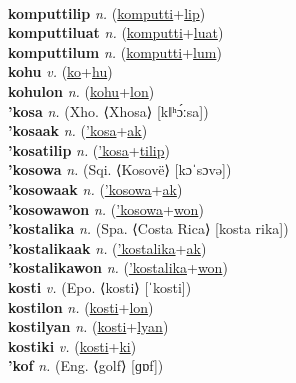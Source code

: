  \label{komputtilon} \\
\textbf{komputtilip} \textit{n.} (\hyperref[komputti]{komputti}+\hyperref[lip]{lip})
 \label{komputtilip} \\
\textbf{komputtiluat} \textit{n.} (\hyperref[komputti]{komputti}+\hyperref[luat]{luat})
 \label{komputtiluat} \\
\textbf{komputtilum} \textit{n.} (\hyperref[komputti]{komputti}+\hyperref[lum]{lum})
 \label{komputtilum} \\
\textbf{kohu} \textit{v.} (\hyperref[ko]{ko}+\hyperref[hu]{hu})
 \label{kohu} \\
\textbf{kohulon} \textit{n.} (\hyperref[kohu]{kohu}+\hyperref[lon]{lon})
 \label{kohulon} \\
\textbf{'kosa} \textit{n.} (Xho. ⟨Xhosa⟩ [kǁʰɔ́ːsa])
 \label{'kosa} \\
\textbf{'kosaak} \textit{n.} (\hyperref['kosa]{'kosa}+\hyperref[ak]{ak})
 \label{'kosaak} \\
\textbf{'kosatilip} \textit{n.} (\hyperref['kosa]{'kosa}+\hyperref[tilip]{tilip})
 \label{'kosatilip} \\
\textbf{'kosowa} \textit{n.} (Sqi. ⟨Kosovë⟩ [kɔˈsɔvə])
 \label{'kosowa} \\
\textbf{'kosowaak} \textit{n.} (\hyperref['kosowa]{'kosowa}+\hyperref[ak]{ak})
 \label{'kosowaak} \\
\textbf{'kosowawon} \textit{n.} (\hyperref['kosowa]{'kosowa}+\hyperref[won]{won})
 \label{'kosowawon} \\
\textbf{'kostalika} \textit{n.} (Spa. ⟨Costa Rica⟩ [kosta rika])
 \label{'kostalika} \\
\textbf{'kostalikaak} \textit{n.} (\hyperref['kostalika]{'kostalika}+\hyperref[ak]{ak})
 \label{'kostalikaak} \\
\textbf{'kostalikawon} \textit{n.} (\hyperref['kostalika]{'kostalika}+\hyperref[won]{won})
 \label{'kostalikawon} \\
\textbf{kosti} \textit{v.} (Epo. ⟨kosti⟩ [ˈkosti])
 \label{kosti} \\
\textbf{kostilon} \textit{n.} (\hyperref[kosti]{kosti}+\hyperref[lon]{lon})
 \label{kostilon} \\
\textbf{kostilyan} \textit{n.} (\hyperref[kosti]{kosti}+\hyperref[lyan]{lyan})
 \label{kostilyan} \\
\textbf{kostiki} \textit{v.} (\hyperref[kosti]{kosti}+\hyperref[ki]{ki})
 \label{kostiki} \\
\textbf{'kof} \textit{n.} (Eng. ⟨golf⟩ [ɡɒf])
 \label{'kof} \\
